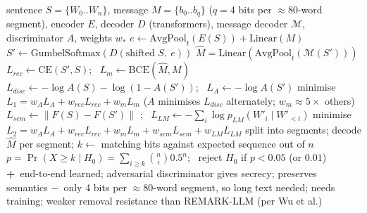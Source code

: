 \documentclass[10pt,a4paper,twocolumn]{article}
\newcommand{\pro}[1]{\Statex\textcolor{proc}{\textbf{+}\ #1}}
\newcommand{\con}[1]{\Statex\textcolor{conc}{\textbf{$-$}\ #1}}
\begin{document}
\begin{algorithm}[H]\small
\caption{AWT (Abdelnabi \& Fritz 2021)}
\begin{algorithmic}[1]
\Require sentence $S=\{W_0..W_n\}$, message $M=\{b_0..b_q\}$ ($q=4$ bits per $\approx$80-word segment), encoder $E$, decoder $D$ (transformers), message decoder $\mathcal M$, discriminator $A$, weights $w_\ast$
 \State $e\gets\mathrm{AvgPool}_t(E(S))+\mathrm{Linear}(M)$ 
 \State $S'\gets\mathrm{GumbelSoftmax}(D(\text{shifted }S,\ e))$ 
\EndFunction
{} \State \Return $\hat M=\mathrm{Linear}(\mathrm{AvgPool}_t(\mathcal M(S')))$ \EndFunction
{}
 \State $L_{rec}\gets\mathrm{CE}(S',S)$; \ $L_m\gets\mathrm{BCE}(\hat M,M)$
 \State $L_{disc}\gets-\log A(S)-\log(1-A(S'))$; \ $L_A\gets-\log A(S')$
 \State minimise $L_1=w_AL_A+w_{rec}L_{rec}+w_mL_m$ ($A$ minimises $L_{disc}$ alternately; $w_m\approx5\times$ others)
\EndProcedure
{}
 \State $L_{sem}\gets\|F(S)-F(S')\|$ ; \ $L_{LM}\gets-\sum_i\log p_{LM}(W'_i\mid W'_{<i})$ 
 \State minimise $L_2=w_AL_A+w_{rec}L_{rec}+w_mL_m+w_{sem}L_{sem}+w_{LM}L_{LM}$
\EndProcedure
{}
 \State split into segments; decode $\hat M$ per segment; $k\gets$ matching bits against expected sequence out of $n$
 \State $p=\Pr(X\ge k\mid H_0)=\sum_{i\ge k}\binom ni0.5^n$; \ reject $H_0$ if $p<0.05$ (or $0.01$)
\EndProcedure
\pro{end-to-end learned; adversarial discriminator gives secrecy; preserves semantics}
\con{only 4 bits per $\approx$80-word segment, so long text needed; needs training; weaker removal resistance than REMARK-LLM (per Wu et al.)}
\end{algorithmic}
\end{algorithm}
\end{document}
